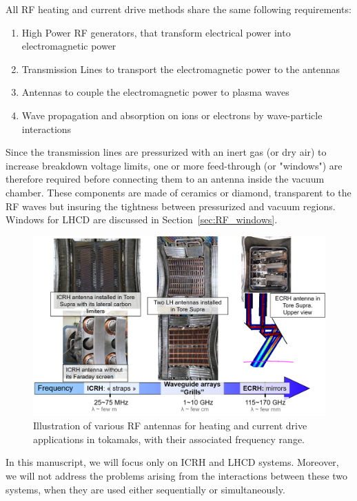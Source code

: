 All RF heating and current drive methods share the same following requirements:
\begin{enumerate}
	\item High Power RF generators, that transform electrical power into electromagnetic power
	\item Transmission Lines to transport the electromagnetic power to the antennas
	\item Antennas to couple the electromagnetic power to plasma waves
	\item Wave propagation and absorption on ions or electrons by wave-particle interactions
\end{enumerate}

Since the transmission lines are pressurized with an inert gas (or dry air) to increase breakdown voltage limits, one or more feed-through (or "windows") are therefore required before connecting them to an antenna inside the vacuum chamber. These components are made of ceramics or diamond, transparent to the RF waves but insuring the tightness between pressurized and vacuum regions. Windows for LHCD are discussed in Section~\ref{sec:RF_windows}.

\begin{figure}[h]
	\centering
	\includegraphics[width=1.0\linewidth]{figures/chap1/RF_HCD_antennas}
	\caption{Illustration of various RF antennas for heating and current drive applications in tokamaks, with their associated frequency range.}
	\label{fig:rfhcdantennas}
\end{figure}


In this manuscript, we will focus only on ICRH and LHCD systems. Moreover, we will not address the problems arising from the interactions between these two systems, when they are used either sequentially or simultaneously.



